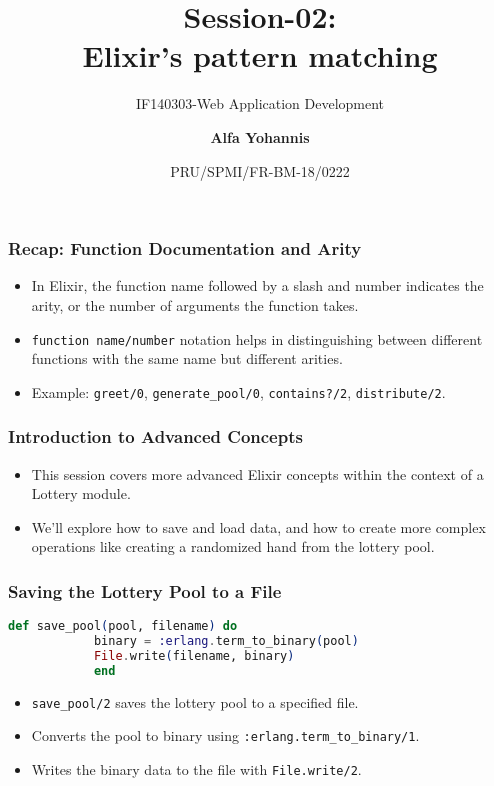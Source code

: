 \documentclass[aspectratio=169, table]{beamer}
\subtitle{IF140303-Web Application Development}
\title{\LARGE{Session-02:\\ Elixir's pattern matching }
	\vspace{20pt}}
\date[Serial]{\scriptsize {PRU/SPMI/FR-BM-18/0222}}
\author[Pradita]{\small{\textbf{Alfa Yohannis}}}
\begin{document}
	
	\frame{\titlepage}
	
	\begin{frame}
		\frametitle{Recap: Function Documentation and Arity}
		\begin{itemize}
			\item In Elixir, the function name followed by a slash and number indicates the arity, or the number of arguments the function takes.
			\item \texttt{function name/number} notation helps in distinguishing between different functions with the same name but different arities.
			\item Example: \texttt{greet/0}, \texttt{generate\_pool/0}, \texttt{contains?/2}, \texttt{distribute/2}.
		\end{itemize}
	\end{frame}
	
	\begin{frame}
		\frametitle{Introduction to Advanced Concepts}
		\begin{itemize}
			\item This session covers more advanced Elixir concepts within the context of a Lottery module.
			\item We’ll explore how to save and load data, and how to create more complex operations like creating a randomized hand from the lottery pool.
		\end{itemize}
	\end{frame}
	
	\begin{frame}[fragile]
		\frametitle{Saving the Lottery Pool to a File}
		\begin{lstlisting}[language=Elixir]
			def save_pool(pool, filename) do
			binary = :erlang.term_to_binary(pool)
			File.write(filename, binary)
			end
		\end{lstlisting}
		\begin{itemize}
			\item \texttt{save\_pool/2} saves the lottery pool to a specified file.
			\item Converts the pool to binary using \texttt{:erlang.term\_to\_binary/1}.
			\item Writes the binary data to the file with \texttt{File.write/2}.
		\end{itemize}
	\end{frame}
	
\end{document}
